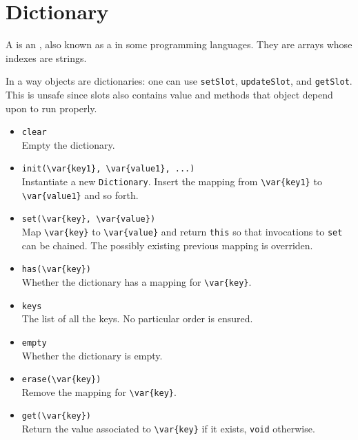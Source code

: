 \section{Dictionary}

A  is an , also known as a
 in some programming languages.  They are arrays whose
indexes are strings.

In a way objects are dictionaries: one can use \lstinline|setSlot|,
\lstinline|updateSlot|, and \lstinline|getSlot|.  This is unsafe since
slots also contains value and methods that object depend upon to run
properly.

\begin{itemize}
\item \lstinline|clear|\\
  Empty the dictionary.

\item \lstinline|init(\var{key1}, \var{value1}, ...)|~\\
  Instantiate a new \lstinline|Dictionary|.  Insert the mapping from
  \lstinline|\var{key1}| to \lstinline|\var{value1}| and so forth.

\item \lstinline|set(\var{key}, \var{value})|\\
  Map \lstinline|\var{key}| to \lstinline|\var{value}| and return
  \lstinline|this| so that invocations to \lstinline|set| can be
  chained.  The possibly existing previous mapping is overriden.

\item \lstinline|has(\var{key})|\\
  Whether the dictionary has a mapping for \lstinline|\var{key}|.

\item \lstinline|keys|\\
  The list of all the keys.  No particular order is ensured.

\item \lstinline|empty|\\
  Whether the dictionary is empty.

\item \lstinline|erase(\var{key})|\\
  Remove the mapping for \lstinline|\var{key}|.

\item \lstinline|get(\var{key})|\\
  Return the value associated to  \lstinline|\var{key}| if it exists,
  \lstinline|void| otherwise.


\end{itemize}
